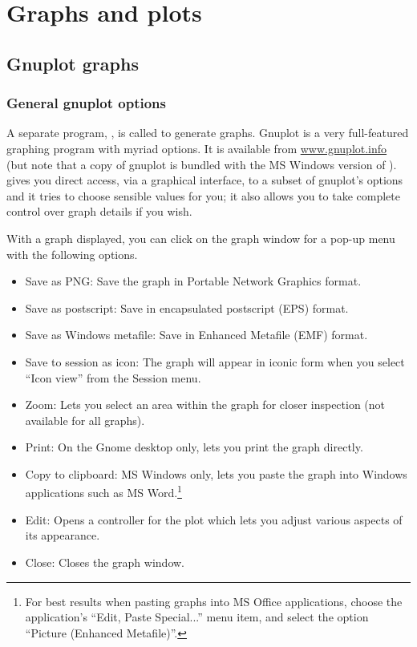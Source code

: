 \chapter{Graphs and plots}
\label{chap-graphs}

\section{Gnuplot graphs}
\label{gnuplot-graphs}

\subsection{General gnuplot options}
\label{gnuplot-opts}

A separate program, , is called to generate graphs.
Gnuplot is a very full-featured graphing program with myriad options.
It is available from \href{http://www.gnuplot.info/}{www.gnuplot.info}
(but note that a copy of gnuplot is bundled with the MS Windows
version of ).   gives you direct access, via a
graphical interface, to a subset of gnuplot's options and it tries to
choose sensible values for you; it also allows you to take complete
control over graph details if you wish.

With a graph displayed, you can click on the graph window for a pop-up
menu with the following options.

\begin{itemize}
\item \textsf{Save as PNG}: Save the graph in Portable Network
  Graphics format.
\item \textsf{Save as postscript}: Save in encapsulated postscript
  (EPS) format.
\item \textsf{Save as Windows metafile}: Save in Enhanced Metafile
  (EMF) format.
\item \textsf{Save to session as icon}: The graph will appear in
  iconic form when you select ``Icon view'' from the Session menu.
\item \textsf{Zoom}: Lets you select an area within the graph for
  closer inspection (not available for all graphs).
\item \textsf{Print}: On the Gnome desktop only, lets you print the
  graph directly.
\item \textsf{Copy to clipboard}: MS Windows only, lets you paste the
  graph into Windows applications such as MS Word.\footnote{For best
    results when pasting graphs into MS Office applications, choose
    the application's ``Edit, Paste Special...'' menu item, and select
    the option ``Picture (Enhanced Metafile)''.}
\item \textsf{Edit}: Opens a controller for the plot which lets you
  adjust various aspects of its appearance.
\item \textsf{Close}: Closes the graph window.
\end{itemize}


